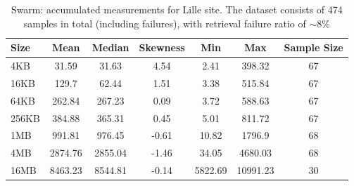 \begin{table}[H]
\centering
\begin{small}
\caption{Swarm: accumulated measurements for Lille site. The dataset consists of 474 samples in total (including failures), with retrieval failure ratio of $\sim 8\%$ }
\begin{tabular}{@{}lcccccc@{}}
\toprule
Size & Mean & Median & Skewness & Min & Max & Sample Size \\ \midrule
4KB & 31.59 & 31.63 & 4.54 & 2.41 & 398.32 & 67\\
16KB & 129.7 & 62.44 & 1.51 & 3.38 & 515.84 & 67\\
64KB & 262.84 & 267.23 & 0.09 & 3.72 & 588.63 & 67\\
256KB & 384.88 & 365.31 & 0.45 & 5.01 & 811.72 & 67\\
1MB & 991.81 & 976.45 & -0.61 & 10.82 & 1796.9 & 68\\
4MB & 2874.76 & 2855.04 & -1.46 & 34.05 & 4680.03 & 68\\
16MB & 8463.23 & 8544.81 & -0.14 & 5822.69 & 10991.23 & 30\\
\bottomrule
\end{tabular}
\end{small}
\end{table}









